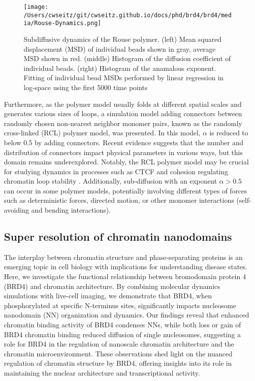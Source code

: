 \begin{figure}[t]
\texttt{[image: /Users/cwseitz/git/cwseitz.github.io/docs/phd/brd4/brd4/media/Rouse-Dynamics.png]}
\caption{Subdiffusive dynamics of the Rouse polymer. (left) Mean squared displacement (MSD) of individual beads shown in gray, average MSD shown in red. (middle) Histogram of the diffusion coefficient of individual beads. (right) Histogram of the anamalous exponent. Fitting of individual bead MSDs performed by linear regression in log-space using the first 5000 time points}
\end{figure}

Furthermore, as the polymer model usually folds at different spatial scales and generates various sizes of loops, a simulation model adding connectors between randomly chosen non-nearest neighbor monomer pairs, known as the randomly cross-linked (RCL) polymer model, was presented. In this model, $\alpha$ is reduced to below 0.5 by adding connectors. Recent evidence suggests that the number and distribution of connectors impact physical parameters in various ways, but this domain remains underexplored. Notably, the RCL polymer model may be crucial for studying dynamics in processes such as CTCF and cohesion regulating chromatin loop stability \parencite{Hansen2017}. Additionally, sub-diffusion with an exponent $\alpha > 0.5$ can occur in some polymer models, potentially involving different types of forces such as deterministic forces, directed motion, or other monomer interactions (self-avoiding and bending interactions).

\subsection{Super resolution of chromatin nanodomains}

The interplay between chromatin structure and phase-separating proteins is an emerging topic in cell biology with implications for understanding disease states. Here, we investigate the functional relationship between bromodomain protein 4 (BRD4) and chromatin architecture. By combining molecular dynamics simulations with live-cell imaging, we demonstrate that BRD4, when phosphorylated at specific N-terminus sites, significantly impacts nucleosome nanodomain (NN) organization and dynamics. Our findings reveal that enhanced chromatin binding activity of BRD4 condenses NNs, while both loss or gain of BRD4 chromatin binding reduced diffusion of single nucleosomes, suggesting a role for BRD4 in the regulation of nanoscale chromatin architecture and the chromatin microenvironment. These observations shed light on the nuanced regulation of chromatin structure by BRD4, offering insights into its role in maintaining the nuclear architecture and transcriptional activity.

